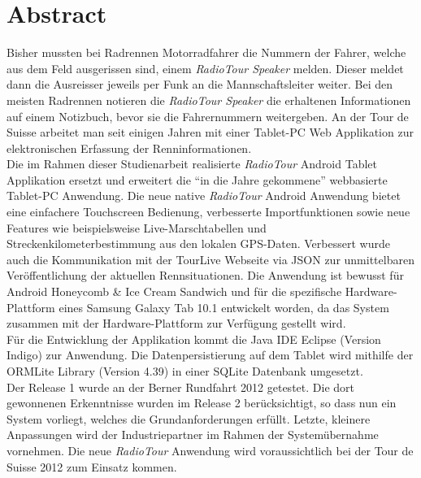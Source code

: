 \chapter*{Abstract}


Bisher mussten bei Radrennen Motorradfahrer die Nummern der Fahrer, welche aus dem Feld ausgerissen sind, einem \textit{RadioTour Speaker} melden. Dieser meldet dann die Ausreisser jeweils per Funk an die Mannschaftsleiter weiter. Bei den meisten Radrennen notieren die \textit{RadioTour Speaker} die erhaltenen Informationen auf einem Notizbuch, bevor sie die Fahrernummern weitergeben. An der Tour de Suisse arbeitet man seit einigen Jahren mit einer Tablet-PC Web Applikation zur elektronischen Erfassung der Renninformationen.
\\
Die im Rahmen dieser Studienarbeit realisierte \textit{RadioTour} Android Tablet Applikation ersetzt und erweitert die "`in die Jahre gekommene"' webbasierte Tablet-PC Anwendung. Die neue native \textit{RadioTour} Android Anwendung bietet eine einfachere Touchscreen Bedienung, verbesserte Importfunktionen sowie neue Features wie beispielsweise Live-Marschtabellen und Streckenkilometerbestimmung aus den lokalen GPS-Daten. Verbessert wurde auch die Kommunikation mit der TourLive Webseite via JSON zur unmittelbaren Veröffentlichung der aktuellen Rennsituationen. Die Anwendung ist bewusst für Android Honeycomb \& Ice Cream Sandwich und für die  spezifische Hardware-Plattform eines Samsung Galaxy Tab 10.1 entwickelt worden, da das System zusammen mit der Hardware-Plattform zur Verfügung gestellt wird.
\\
Für die Entwicklung der Applikation kommt die Java IDE Eclipse (Version Indigo) zur Anwendung. Die Datenpersistierung auf dem Tablet wird mithilfe der ORMLite Library (Version 4.39) in einer SQLite Datenbank umgesetzt.
\\
Der Release 1 wurde an der Berner Rundfahrt 2012 getestet. Die dort gewonnenen Erkenntnisse wurden im Release 2 berücksichtigt, so dass nun ein System vorliegt, welches die Grundanforderungen erfüllt. Letzte, kleinere Anpassungen wird der Industriepartner im Rahmen der Systemübernahme vornehmen. Die neue \textit{RadioTour} Anwendung wird voraussichtlich bei der Tour de Suisse 2012 zum Einsatz kommen.
